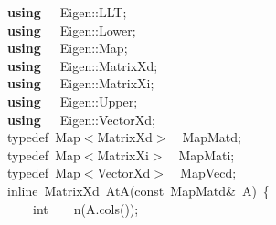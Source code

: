 \documentclass[shortnames,article,nojss]{jss}
\newcommand{\hlstd}[1]{\textcolor[rgb]{0,0,0}{#1}}
\newcommand{\hlopt}[1]{\textcolor[rgb]{0,0,0}{#1}}
\newcommand{\hlkwa}[1]{\textcolor[rgb]{0.61,0.13,0.93}{\bf{#1}}}
\newcommand{\hlkwb}[1]{\textcolor[rgb]{0.13,0.54,0.13}{#1}}
\newcommand{\hlkwc}[1]{\textcolor[rgb]{0,0,1}{#1}}
\newcommand{\hlkwd}[1]{\textcolor[rgb]{0,0,0}{#1}}
\begin{document}
\begin{figure}[htb]
  \noindent
  \ttfamily
  \hlstd{}\hlkwa{using}\hlstd{\ \ \ }\hlkwa{}\hlstd{Eigen}\hlopt{::}\hlstd{LLT}\hlopt{;}\hspace*{\fill}\\
  \hlstd{}\hlkwa{using}\hlstd{\ \ \ }\hlkwa{}\hlstd{Eigen}\hlopt{::}\hlstd{Lower}\hlopt{;}\hspace*{\fill}\\
  \hlstd{}\hlkwa{using}\hlstd{\ \ \ }\hlkwa{}\hlstd{Eigen}\hlopt{::}\hlstd{Map}\hlopt{;}\hspace*{\fill}\\
  \hlstd{}\hlkwa{using}\hlstd{\ \ \ }\hlkwa{}\hlstd{Eigen}\hlopt{::}\hlstd{MatrixXd}\hlopt{;}\hspace*{\fill}\\
  \hlstd{}\hlkwa{using}\hlstd{\ \ \ }\hlkwa{}\hlstd{Eigen}\hlopt{::}\hlstd{MatrixXi}\hlopt{;}\hspace*{\fill}\\
  \hlstd{}\hlkwa{using}\hlstd{\ \ \ }\hlkwa{}\hlstd{Eigen}\hlopt{::}\hlstd{Upper}\hlopt{;}\hspace*{\fill}\\
  \hlstd{}\hlkwa{using}\hlstd{\ \ \ }\hlkwa{}\hlstd{Eigen}\hlopt{::}\hlstd{VectorXd}\hlopt{;}\hspace*{\fill}\\
  \hlstd{}\hlkwc{typedef\ }\hlstd{Map}\hlopt{$<$}\hlstd{MatrixXd}\hlopt{$>$}\hlstd{\ \ }\hlopt{}\hlstd{MapMatd}\hlopt{;}\hspace*{\fill}\\
  \hlstd{}\hlkwc{typedef\ }\hlstd{Map}\hlopt{$<$}\hlstd{MatrixXi}\hlopt{$>$}\hlstd{\ \ }\hlopt{}\hlstd{MapMati}\hlopt{;}\hspace*{\fill}\\
  \hlstd{}\hlkwc{typedef\ }\hlstd{Map}\hlopt{$<$}\hlstd{VectorXd}\hlopt{$>$}\hlstd{\ \ }\hlopt{}\hlstd{MapVecd}\hlopt{;}\hspace*{\fill}\\
  \hlstd{}\hlkwc{inline\ }\hlstd{MatrixXd\ }\hlkwd{AtA}\hlstd{}\hlopt{(}\hlstd{}\hlkwb{const\ }\hlstd{MapMatd}\hlopt{\&\ }\hlstd{A}\hlopt{)\ \{}\hspace*{\fill}\\
  \hlstd{}\hlstd{\ \ \ \ }\hlstd{}\hlkwb{int}\hlstd{\ \ \ \ }\hlkwb{}\hlstd{}\hlkwd{n}\hlstd{}\hlopt{(}\hlstd{A}\hlopt{.}\hlstd{}\hlkwd{cols}\hlstd{}\hlopt{());}\hspace*{\fill}\\

\end{figure}
\end{document}
